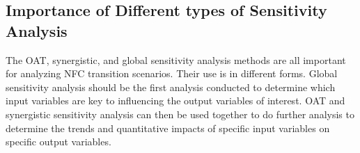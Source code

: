 \subsection{Importance of Different types of Sensitivity Analysis}
The OAT, synergistic, and global sensitivity analysis methods 
are all important for analyzing \gls{NFC} transition scenarios. 
Their use is in different forms. 
Global sensitivity analysis should be the first analysis conducted to 
determine which input variables are key to influencing the output 
variables of interest. 
OAT and synergistic sensitivity analysis can then be used together to 
do further analysis to determine the trends and quantitative impacts 
of specific input variables on specific output variables. 
